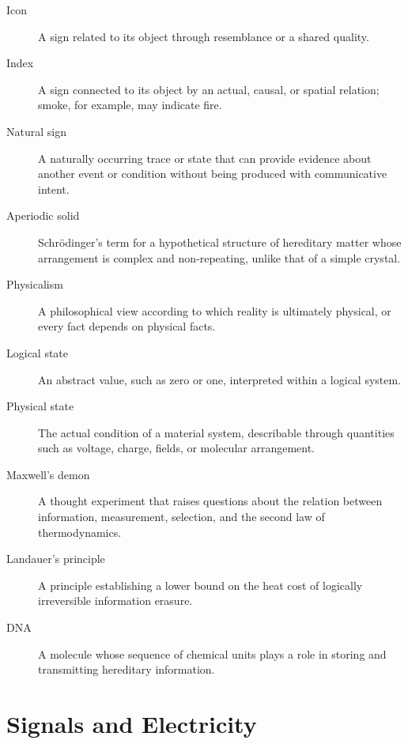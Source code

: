 \begin{description}
  \item[Icon] A sign related to its object through resemblance or a shared quality.
  \item[Index] A sign connected to its object by an actual, causal, or spatial relation; smoke, for example, may indicate fire.
  \item[Natural sign] A naturally occurring trace or state that can provide evidence about another event or condition without being produced with communicative intent.
  \item[Aperiodic solid] Schrödinger's term for a hypothetical structure of hereditary matter whose arrangement is complex and non-repeating, unlike that of a simple crystal.
  \item[Physicalism] A philosophical view according to which reality is ultimately physical, or every fact depends on physical facts.
  \item[Logical state] An abstract value, such as zero or one, interpreted within a logical system.
  \item[Physical state] The actual condition of a material system, describable through quantities such as voltage, charge, fields, or molecular arrangement.
  \item[Maxwell's demon] A thought experiment that raises questions about the relation between information, measurement, selection, and the second law of thermodynamics.
  \item[Landauer's principle] A principle establishing a lower bound on the heat cost of logically irreversible information erasure.
  \item[DNA] A molecule whose sequence of chemical units plays a role in storing and transmitting hereditary information.
\end{description}

\section*{Signals and Electricity}

